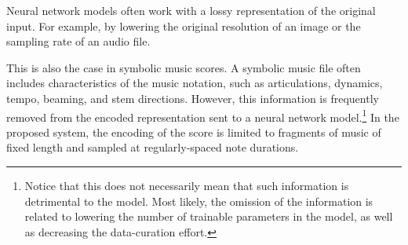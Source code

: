 
Neural network models often work with a lossy representation
of the original input. For example, by lowering the original
resolution of an image or the sampling rate of an audio
file.

This is also the case in symbolic music scores. A symbolic
music file often includes characteristics of the music
notation, such as articulations, dynamics, tempo, beaming,
and stem directions. However, this information is frequently
removed from the encoded representation sent to a neural
network model.\footnote{Notice that this does not
necessarily mean that such information is detrimental to the
model. Most likely, the omission of the information is
related to lowering the number of trainable parameters in
the model, as well as decreasing the data-curation effort.}
In the proposed system, the encoding of the score is limited
to fragments of music of fixed length and sampled at
regularly-spaced note durations.
